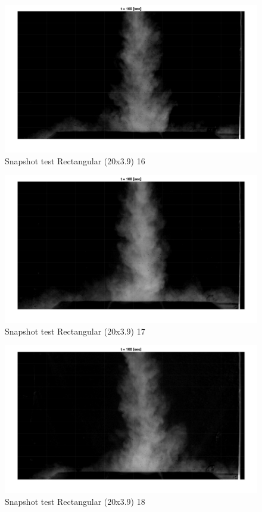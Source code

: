 \begin{figure}[ht!]
    \centering
    \includegraphics[width=\linewidth]{Images/Rec20_16_t100.jpg}
    \caption{Snapshot test Rectangular (20x3.9) 16}
\end{figure}

\begin{figure}[ht!]
    \centering
    \includegraphics[width=\linewidth]{Images/Rec20_17_t100.jpg}
    \caption{Snapshot test Rectangular (20x3.9) 17}
\end{figure}

\begin{figure}[ht!]
    \centering
    \includegraphics[width=\linewidth]{Images/Rec20_18_t100.jpg}
    \caption{Snapshot test Rectangular (20x3.9) 18}
\end{figure}

